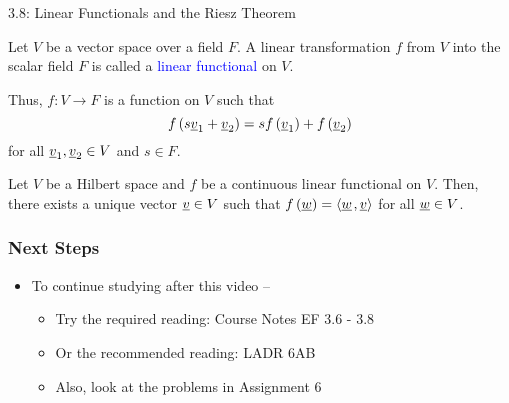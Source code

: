 \documentclass[10pt,english,aspectratio=169]{beamer}
\begin{document}
\begin{frame}{3.8: Linear Functionals and the Riesz Theorem}

\begin{definition}
Let $V$ be a vector space over a field $F$.
A linear transformation $f$ from $V$ into the scalar field $F$ is called a \textcolor{blue}{linear functional} on $V$.
\end{definition}

\begin{example}
Thus, $f\colon V \to F$ is a function on $V$ such that
\begin{equation*}
f \left( s \underline{v}_1 + \underline{v}_2 \right)
= s f \left( \underline{v}_1 \right) + f \left( \underline{v}_2 \right)
\end{equation*}
for all $\underline{v}_1, \underline{v}_2 \in V$ and $s \in F$.
\end{example}

\begin{theorem}[Riesz]
Let $V$ be a Hilbert space and $f$ be a continuous linear functional on $V$.
Then, there exists a unique vector $\underline{v} \in V$ such that $f \left( \underline{w} \right) = {\left\langle  \underline{w}  \mskip2mu ,  \underline{v}  \right\rangle}$ for all $\underline{w} \in V$.
\end{theorem}

\end{frame}



\begin{frame} \frametitle{Next Steps}

\begin{itemize}
\setlength\itemsep{5mm}
\item To continue studying after this video -- \vspace{2mm}

\begin{itemize}
 \setlength\itemsep{3mm}
 \item Try the required reading: Course Notes EF 3.6 - 3.8
 \item Or the recommended reading: LADR 6AB
 \item Also, look at the problems in Assignment 6
\end{itemize}
\end{itemize}


\end{frame}
\end{document}
